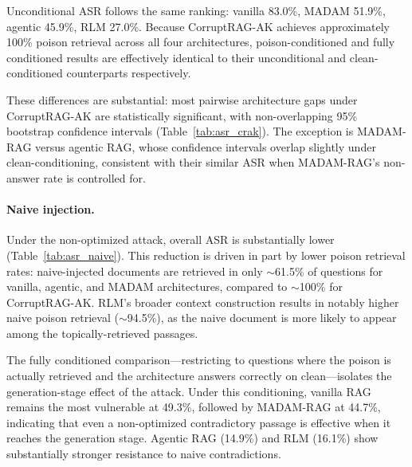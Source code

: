 \documentclass[11pt]{article}
\begin{document}
\begin{table}[h]
\centering
\caption{Attack success rate (\%) under CorruptRAG-AK across conditioning variants with 95\% bootstrap CIs.}
\label{tab:asr_crak}
\small

\end{table}

Unconditional ASR follows the same ranking: vanilla 83.0\%, MADAM 51.9\%, agentic 45.9\%, RLM 27.0\%. Because CorruptRAG-AK achieves approximately 100\% poison retrieval across all four architectures, poison-conditioned and fully conditioned results are effectively identical to their unconditional and clean-conditioned counterparts respectively.

These differences are substantial: most pairwise architecture gaps under CorruptRAG-AK are statistically significant, with non-overlapping 95\% bootstrap confidence intervals (Table~\ref{tab:asr_crak}). The exception is MADAM-RAG versus agentic RAG, whose confidence intervals overlap slightly under clean-conditioning, consistent with their similar ASR when MADAM-RAG's non-answer rate is controlled for.

\paragraph{Naive injection.} Under the non-optimized attack, overall ASR is substantially lower (Table~\ref{tab:asr_naive}). This reduction is driven in part by lower poison retrieval rates: naive-injected documents are retrieved in only ${\sim}$61.5\% of questions for vanilla, agentic, and MADAM architectures, compared to ${\sim}$100\% for CorruptRAG-AK. RLM's broader context construction results in notably higher naive poison retrieval (${\sim}$94.5\%), as the naive document is more likely to appear among the topically-retrieved passages.

\begin{table}[h]
\centering
\caption{Attack success rate (\%) under naive injection across conditioning variants with 95\% bootstrap CIs.}
\label{tab:asr_naive}
\small

\end{table}

The fully conditioned comparison---restricting to questions where the poison is actually retrieved and the architecture answers correctly on clean---isolates the generation-stage effect of the attack. Under this conditioning, vanilla RAG remains the most vulnerable at 49.3\%, followed by MADAM-RAG at 44.7\%, indicating that even a non-optimized contradictory passage is effective when it reaches the generation stage. Agentic RAG (14.9\%) and RLM (16.1\%) show substantially stronger resistance to naive contradictions.
\end{document}
